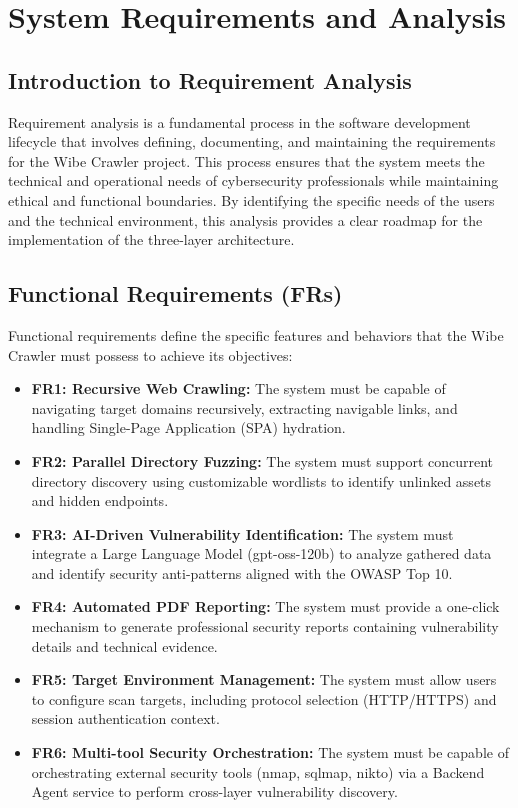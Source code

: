 \documentclass[12pt,oneside,a4paper]{book}
\begin{document}
\chapter{System Requirements and Analysis}
\label{chap:requirements}

\section{Introduction to Requirement Analysis}
Requirement analysis is a fundamental process in the software development lifecycle that involves defining, documenting, and maintaining the requirements for the Wibe Crawler project. This process ensures that the system meets the technical and operational needs of cybersecurity professionals while maintaining ethical and functional boundaries. By identifying the specific needs of the users and the technical environment, this analysis provides a clear roadmap for the implementation of the three-layer architecture.

\section{Functional Requirements (FRs)}
Functional requirements define the specific features and behaviors that the Wibe Crawler must possess to achieve its objectives:
\begin{itemize}
    \item \textbf{FR1: Recursive Web Crawling:} The system must be capable of navigating target domains recursively, extracting navigable links, and handling Single-Page Application (SPA) hydration.
    \item \textbf{FR2: Parallel Directory Fuzzing:} The system must support concurrent directory discovery using customizable wordlists to identify unlinked assets and hidden endpoints.
    \item \textbf{FR3: AI-Driven Vulnerability Identification:} The system must integrate a Large Language Model (gpt-oss-120b) to analyze gathered data and identify security anti-patterns aligned with the OWASP Top 10.
    \item \textbf{FR4: Automated PDF Reporting:} The system must provide a one-click mechanism to generate professional security reports containing vulnerability details and technical evidence.
    \item \textbf{FR5: Target Environment Management:} The system must allow users to configure scan targets, including protocol selection (HTTP/HTTPS) and session authentication context.
    \item \textbf{FR6: Multi-tool Security Orchestration:} The system must be capable of orchestrating external security tools (nmap, sqlmap, nikto) via a Backend Agent service to perform cross-layer vulnerability discovery.
\end{itemize}
\end{document}
